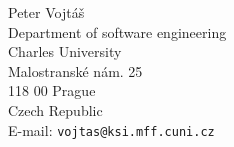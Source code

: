 \documentclass{book}
\begin{document}
\tableofcontents

\setcounter{paper}{5}
\setcounter{chapter}{5}


{}

\medskip
\noindent Peter Vojt\'{a}\v{s}
\\Department of software engineering
\\Charles University
\\Malostransk\'{e} n\'{a}m. 25
\\118 00 Prague
\\Czech Republic
\\E-mail: \texttt{vojtas@ksi.mff.cuni.cz}


\EndPaper


%
%
%
%
%
%
%
%
%
%
%
%
%
%
%
%
%
%
%
%
\end{document}
